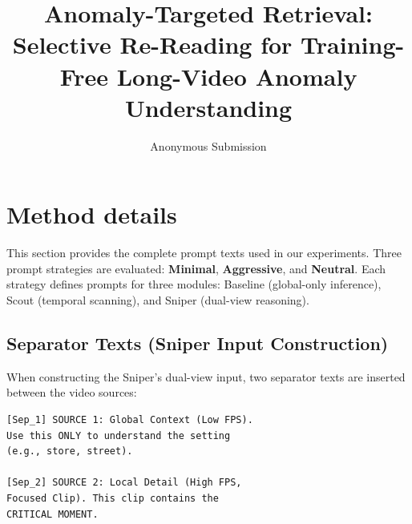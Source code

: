 \documentclass[letterpaper]{article}
\title{Anomaly-Targeted Retrieval: Selective Re-Reading for Training-Free Long-Video Anomaly Understanding}
\author{Anonymous Submission}
\begin{document}
\maketitle


















\appendix
\section{Method details}
\label{sec:appendix_prompts}

This section provides the complete prompt texts used in our experiments. Three prompt strategies are evaluated: \textbf{Minimal}, \textbf{Aggressive}, and \textbf{Neutral}. Each strategy defines prompts for three modules: Baseline (global-only inference), Scout (temporal scanning), and Sniper (dual-view reasoning).

\subsection{Separator Texts (Sniper Input Construction)}

When constructing the Sniper's dual-view input, two separator texts are inserted between the video sources:

\begin{small}
\begin{verbatim}
[Sep_1] SOURCE 1: Global Context (Low FPS).
Use this ONLY to understand the setting
(e.g., store, street).

[Sep_2] SOURCE 2: Local Detail (High FPS,
Focused Clip). This clip contains the
CRITICAL MOMENT.
\end{verbatim}
\end{small}
\end{document}
